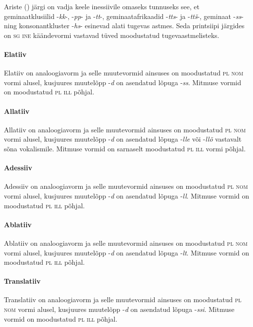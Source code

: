 \documentclass[12pt,a4paper]{article}
\newcommand{\msd}[1]{\textsc{#1}}
\begin{document}
Ariste (\citeyear[23]{ariste_grammar_1968}) järgi on vadja keele inessiivile omaseks tunnuseks see, et geminaat\-klusiilid -\textit{kk}-, -\textit{pp}- ja -\textit{tt}-, geminaat\-afrikaadid -\textit{tts}- ja -\textit{ttš}-, geminaat -\textit{ss}- ning konsonant\-kluster -\textit{hs}- esinevad alati tugevas astmes. Seda printsiipi järgides on \msd{sg ine} käände\-vormi vastavad tüved moodustatud tugeva\-astmelisteks.


\paragraph*{Elatiiv}
Elatiiv on analoogiavorm ja selle muutevormid ainsuses on moodustatud \msd{pl nom} vormi alusel, kusjuures muutelõpp -\textit{d} on asendatud lõpuga -\textit{ss}. Mitmuse vormid on moodustatud \msd{pl ill} põhjal.


\paragraph*{Allatiiv}
Allatiiv on analoogiavorm ja selle muutevormid ainsuses on moodustatud \msd{pl nom} vormi alusel, kusjuures muutelõpp -\textit{d} on asendatud lõpuga -\textit{lle} või -\textit{llõ} vastavalt sõna vokalismile. Mitmuse vormid on sarnaselt moodustatud \msd{pl ill} vormi põhjal.


\paragraph*{Adessiiv}
Adessiiv on analoogiavorm ja selle muutevormid ainsuses on moodustatud \msd{pl nom} vormi alusel, kusjuures muutelõpp -\textit{d} on asendatud lõpuga -\textit{ll}. Mitmuse vormid on moodustatud \msd{pl ill} põhjal.


\paragraph*{Ablatiiv}
Ablatiiv on analoogiavorm ja selle muutevormid ainsuses on moodustatud \msd{pl nom} vormi alusel, kusjuures muutelõpp -\textit{d} on asendatud lõpuga -\textit{lt}. Mitmuse vormid on moodustatud \msd{pl ill} põhjal.


\paragraph*{Translatiiv}
Translatiiv on analoogiavorm ja selle muutevormid ainsuses on moodustatud \msd{pl nom} vormi alusel, kusjuures muutelõpp -\textit{d} on asendatud lõpuga -\textit{ssi}. Mitmuse vormid on moodustatud \msd{pl ill} põhjal.
\end{document}
